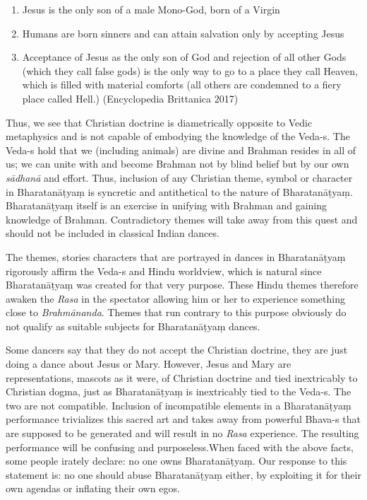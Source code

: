 \begin{enumerate}[{\rm 1)}]
\itemsep=0pt
\item Jesus is the only son of a male Mono-God, born of a Virgin 

 \item Humans are born sinners and can attain salvation only by accepting Jesus

 \item Acceptance of Jesus as the only son of God and rejection of all other Gods (which they call false gods) is the only way to go to a place they call Heaven, which is filled with material comforts (all others are condemned to a fiery place called Hell.) (Encyclopedia Brittanica 2017)

\end{enumerate}

Thus, we see that Christian doctrine is diametrically opposite to Vedic metaphysics and is not capable of embodying the knowledge of the Veda-s. The Veda-s hold that we (including animals) are divine and Brahman resides in all of us; we can unite with and become Brahman not by blind belief but by our own \textit{sādhanā} and effort. Thus, inclusion of any Christian theme, symbol or character in Bharatanāṭyaṃ is syncretic and antithetical to the nature of Bharatanāṭyaṃ. Bharatanāṭyaṃ itself is an exercise in unifying with Brahman and gaining knowledge of Brahman. Contradictory themes will take away from this quest and should not be included in classical Indian dances.

The themes, stories characters that are portrayed in dances in Bharatanāṭyaṃ rigorously affirm the Veda-s and Hindu worldview, which is natural since Bharatanāṭyaṃ was created for that very purpose. These Hindu themes therefore awaken the \textit{Rasa} in the spectator allowing him or her to experience something close to \textit{Brahmānanda}. Themes that run contrary to this purpose obviously do not qualify as suitable subjects for Bharatanāṭyaṃ dances.

Some dancers say that they do not accept the Christian doctrine, they are just doing a dance about Jesus or Mary. However, Jesus and Mary are representations, mascots as it were, of Christian doctrine and tied inextricably to Christian dogma, just as Bharatanāṭyaṃ is inextricably tied to the Veda-s. The two are not compatible. Inclusion of incompatible elements in a Bharatanāṭyaṃ performance trivializes this sacred art and takes away from powerful Bhava-s that are supposed to be generated and will result in no \textit{Rasa} experience. The resulting performance will be confusing and purposeless.When faced with the above facts, some people irately declare: no one owns Bharatanāṭyaṃ. Our response to this statement is: no one should abuse Bharatanāṭyaṃ either, by exploiting it for their own agendas or inflating their own egos.


